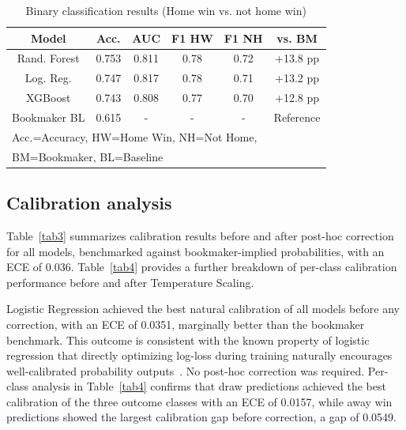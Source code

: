 \documentclass[conference]{IEEEtran}
\begin{document}
\begin{table}[htbp]
\caption{Binary classification results (Home win vs. not home win)}
\begin{center}
\begin{tabular}{|c|c|c|c|c|c|}
\hline
\textbf{Model} & \textbf{Acc.} & \textbf{AUC} &
\textbf{F1 HW} & \textbf{F1 NH} & \textbf{vs. BM} \\
\hline
Rand. Forest & 0.753 & 0.811 & 0.78 & 0.72 & +13.8 pp \\
\hline
Log. Reg. & 0.747 & 0.817 & 0.78 & 0.71 & +13.2 pp \\
\hline
XGBoost & 0.743 & 0.808 & 0.77 & 0.70 & +12.8 pp \\
\hline
Bookmaker BL & 0.615 & - & - & - & Reference \\
\hline
\multicolumn{6}{l}{Acc.=Accuracy, HW=Home Win, NH=Not Home,} \\
\multicolumn{6}{l}{BM=Bookmaker, BL=Baseline}
\end{tabular}
\label{tab2}
\end{center}
\end{table}

\subsection{Calibration analysis}
Table~\ref{tab3} summarizes calibration results before
and after post-hoc correction for all models, benchmarked
against bookmaker-implied probabilities, with an ECE of
0.036. Table~\ref{tab4} provides a further breakdown of
per-class calibration performance before and after
Temperature Scaling.

Logistic Regression achieved the best natural calibration
of all models before any correction, with an ECE of 0.0351,
marginally better than the bookmaker benchmark. This outcome
is consistent with the known property of logistic regression
that directly optimizing log-loss during training naturally
encourages well-calibrated probability outputs~\cite{b6}\cite{b10}.
No post-hoc correction was required. Per-class analysis in
Table~\ref{tab4} confirms that draw predictions achieved
the best calibration of the three outcome classes with an
ECE of 0.0157, while away win predictions showed the largest
calibration gap before correction, a gap of 0.0549.
\end{document}
